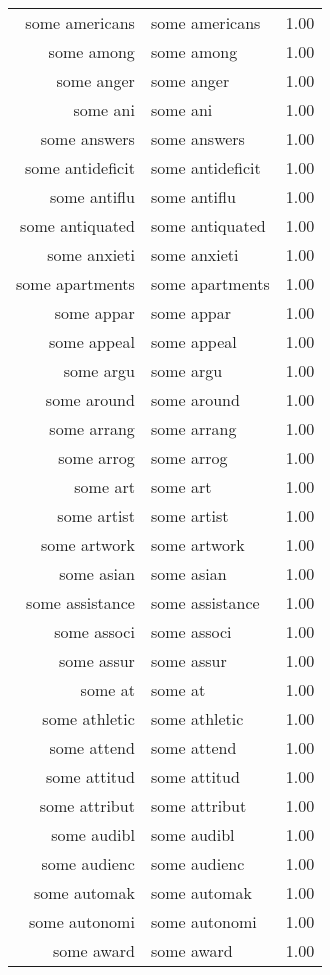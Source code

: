 \begin{table}[ht]
\begin{tabular}{rlr}
  some americans & some americans & 1.00 \\ 
  some among & some among & 1.00 \\ 
  some anger & some anger & 1.00 \\ 
  some ani & some ani & 1.00 \\ 
  some answers & some answers & 1.00 \\ 
  some antideficit & some antideficit & 1.00 \\ 
  some antiflu & some antiflu & 1.00 \\ 
  some antiquated & some antiquated & 1.00 \\ 
  some anxieti & some anxieti & 1.00 \\ 
  some apartments & some apartments & 1.00 \\ 
  some appar & some appar & 1.00 \\ 
  some appeal & some appeal & 1.00 \\ 
  some argu & some argu & 1.00 \\ 
  some around & some around & 1.00 \\ 
  some arrang & some arrang & 1.00 \\ 
  some arrog & some arrog & 1.00 \\ 
  some art & some art & 1.00 \\ 
  some artist & some artist & 1.00 \\ 
  some artwork & some artwork & 1.00 \\ 
  some asian & some asian & 1.00 \\ 
  some assistance & some assistance & 1.00 \\ 
  some associ & some associ & 1.00 \\ 
  some assur & some assur & 1.00 \\ 
  some at & some at & 1.00 \\ 
  some athletic & some athletic & 1.00 \\ 
  some attend & some attend & 1.00 \\ 
  some attitud & some attitud & 1.00 \\ 
  some attribut & some attribut & 1.00 \\ 
  some audibl & some audibl & 1.00 \\ 
  some audienc & some audienc & 1.00 \\ 
  some automak & some automak & 1.00 \\ 
  some autonomi & some autonomi & 1.00 \\ 
  some award & some award & 1.00 \\ 

\end{tabular}
\end{table}
